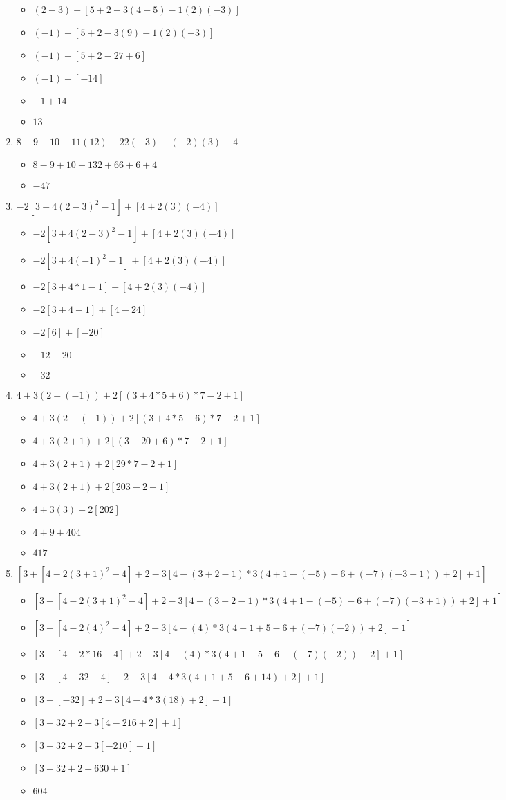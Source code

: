 \documentclass{article}
\begin{document}
\begin{enumerate}
  \begin{itemize}
  \item $(2-3)-[5+2-3(4+5)-1(2)(-3)]$
  \item $(-1)-[5+2-3(9)-1(2)(-3)]$
  \item $(-1)-[5+2-27+6]$
  \item $(-1)-[-14]$
  \item $-1+14$
  \item $13$
  \end{itemize}
\item $8-9+10-11(12)-22(-3)-(-2)(3)+4$
  \begin{itemize}
  \item $8-9+10-132+66+6+4$
  \item $-47$
  \end{itemize}
\item $-2[3+4(2-3)^{2}-1]+[4+2(3)(-4)]$
  \begin{itemize}
  \item $-2[3+4(2-3)^{2}-1]+[4+2(3)(-4)]$
  \item $-2[3+4(-1)^{2}-1]+[4+2(3)(-4)]$
  \item $-2[3+4*1-1]+[4+2(3)(-4)]$
  \item $-2[3+4-1]+[4-24]$
  \item $-2[6]+[-20]$
  \item $-12-20$
  \item $-32$
  \end{itemize}
\item $4+3(2-(-1))+2[(3+4*5+6)*7-2+1]$
  \begin{itemize}
  \item $4+3(2-(-1))+2[(3+4*5+6)*7-2+1]$
  \item $4+3(2+1)+2[(3+20+6)*7-2+1]$
  \item $4+3(2+1)+2[29*7-2+1]$
  \item $4+3(2+1)+2[203-2+1]$
  \item $4+3(3)+2[202]$
  \item $4+9+404$
  \item $417$
  \end{itemize}
\item $[3+[4-2(3+1)^{2}-4]+2-3[4-(3+2-1)*3(4+1-(-5)-6+(-7)(-3+1))+2]+1]$
  \begin{itemize}
  \item $[3+[4-2(3+1)^{2}-4]+2-3[4-(3+2-1)*3(4+1-(-5)-6+(-7)(-3+1))+2]+1]$
  \item $[3+[4-2(4)^{2}-4]+2-3[4-(4)*3(4+1+5-6+(-7)(-2))+2]+1]$
  \item $[3+[4-2*16-4]+2-3[4-(4)*3(4+1+5-6+(-7)(-2))+2]+1]$
  \item $[3+[4-32-4]+2-3[4-4*3(4+1+5-6+14)+2]+1]$
  \item $[3+[-32]+2-3[4-4*3(18)+2]+1]$
  \item $[3-32+2-3[4-216+2]+1]$
  \item $[3-32+2-3[-210]+1]$
  \item $[3-32+2+630+1]$
  \item $604$
  \end{itemize}
\end{enumerate}
\end{document}
